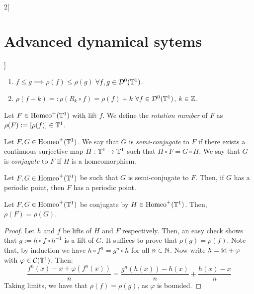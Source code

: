 \documentclass[../../../main_math.tex]{subfiles}
\begin{document}
\begin{multicols}{2}[\section{Advanced dynamical sytems}]
\begin{proposition}
\begin{enumerate}
      \item $f\leq g\implies \rho(f)\leq \rho(g)$ $\forall f,g\in \mathcal{D}^0(\mathbb{T}^1)$.
      \item $\rho(f+k)=:\rho(R_k\circ f)=\rho(f) + k$ $\forall f\in \mathcal{D}^0(\mathbb{T}^1)$, $k\in\mathbb{Z}$.
    \end{enumerate}
  \end{proposition}
  \begin{definition}
    Let $F\in \mathrm{Homeo}^+(\mathbb{T}^1)$ with lift $f$. We define the \emph{rotation number} of $F$ as $\rho(F):=[\rho(f)]\in \mathbb{T}^1$.
  \end{definition}
  \begin{definition}
    Let $F,G\in\mathrm{Homeo}^+(\mathbb{T}^1)$. We say that $G$ is \emph{semi-conjugate} to $F$ if there exists a continuous surjective map $H:\mathbb{T}^1\to \mathbb{T}^1$ such that $H\circ F=G\circ H$. We say that $G$ is \emph{conjugate} to $F$ if $H$ is a homeomorphism.
  \end{definition}
  \begin{lemma}
    Let $F,G\in\mathrm{Homeo}^+(\mathbb{T}^1)$ be such that $G$ is semi-conjugate to $F$. Then, if $G$ has a periodic point, then $F$ has a periodic point.
  \end{lemma}
  \begin{theorem}
    Let $F,G\in\mathrm{Homeo}^+(\mathbb{T}^1)$ be conjugate by $H\in \mathrm{Homeo}^+(\mathbb{T}^1)$. Then, $\rho(F)=\rho(G)$.
  \end{theorem}
  \begin{proof}
    Let $h$ and $f$ be lifts of $H$ and $F$ respectively. Then, an easy check shows that $g:=h\circ f\circ h^{-1}$ is a lift of $G$. It suffices to prove that $\rho(g)=\rho(f)$. Note that, by induction we have $h\circ f^n=g^n\circ h$ for all $n\in\mathbb{N}$. Now write $h=\mathrm{id} + \varphi$ with $\varphi\in \mathcal{C}(\mathbb{T}^1)$. Then:
    \begin{equation*}
      \frac{f^n(x)-x+\varphi(f^n(x))}{n}= \frac{g^n(h(x))-h(x)}{n}+\frac{h(x)-x}{n}
    \end{equation*}
    Taking limits, we have that $\rho(f)=\rho(g)$, as $\varphi$ is bounded.
  \end{proof}

\end{multicols}
\end{document}
